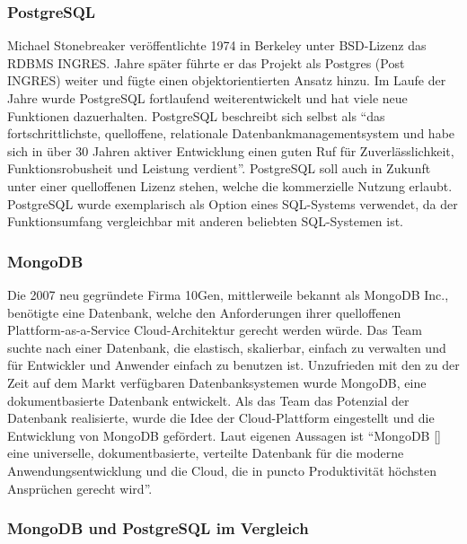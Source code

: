 \subsubsection{PostgreSQL}
Michael Stonebreaker veröffentlichte 1974 in Berkeley unter BSD-Lizenz das RDBMS INGRES. Jahre später führte er das Projekt als Postgres (Post INGRES) weiter und fügte einen objektorientierten Ansatz hinzu. \cite{PG1} Im Laufe der Jahre wurde PostgreSQL fortlaufend weiterentwickelt und hat viele neue Funktionen dazuerhalten.
PostgreSQL beschreibt sich selbst als \enquote{das fortschrittlichste, quelloffene, relationale Datenbankmanagementsystem und habe sich in über 30 Jahren aktiver Entwicklung einen guten Ruf für Zuverlässlichkeit, Funktionsrobusheit und Leistung verdient}. \cite{PG2} PostgreSQL soll auch in Zukunft unter einer quelloffenen Lizenz stehen, welche die kommerzielle Nutzung erlaubt. \cite{PG3}
PostgreSQL wurde exemplarisch als Option eines SQL-Systems verwendet, da der Funktionsumfang vergleichbar mit anderen beliebten SQL-Systemen ist. \cite{PG4}

\subsubsection{MongoDB}
Die 2007 neu gegründete Firma 10Gen, mittlerweile bekannt als MongoDB Inc., benötigte eine Datenbank, welche den Anforderungen ihrer quelloffenen Plattform-as-a-Service Cloud-Architektur gerecht werden würde. Das Team suchte nach einer Datenbank, die elastisch, skalierbar, einfach zu verwalten und für Entwickler und Anwender einfach zu benutzen ist. Unzufrieden mit den zu der Zeit auf dem Markt verfügbaren Datenbanksystemen wurde MongoDB, eine dokumentbasierte Datenbank entwickelt. Als das Team das Potenzial der Datenbank realisierte, wurde die Idee der Cloud-Plattform eingestellt und die Entwicklung von MongoDB gefördert.\cite{MG1}
Laut eigenen Aussagen ist \enquote{MongoDB [] eine universelle, dokumentbasierte, verteilte Datenbank für die moderne Anwendungsentwicklung und die Cloud, die in puncto Produktivität höchsten Ansprüchen gerecht wird}. \cite{MG2} 


\subsubsection{MongoDB und PostgreSQL im Vergleich}

